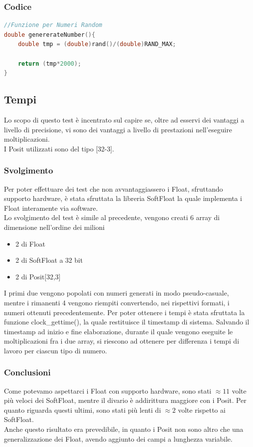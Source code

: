 \documentclass[a4paper,11pt]{article}
\begin{document}
\subsubsection{Codice}
\begin{lstlisting}[language=C++]
//Funzione per Numeri Random
double genererateNumber(){
	double tmp = (double)rand()/(double)RAND_MAX;
	
	return (tmp*2000);
}

\end{lstlisting}
\newpage
\subsection{Tempi}
Lo scopo di questo test è incentrato sul capire se, oltre ad esservi dei vantaggi a livello di precisione, vi sono dei vantaggi a livello di prestazioni nell'eseguire moltiplicazioni.\\
I Posit utilizzati sono del tipo [32-3]. 


\subsubsection{Svolgimento}
Per poter effettuare dei test che non avvantaggiassero i Float, sfruttando supporto hardware, è stata sfruttata la libreria SoftFloat\cite{softfloat} la quale implementa i Float interamente via software.\\
Lo svolgimento del test è simile al precedente, vengono creati 6 array di dimensione nell'ordine dei milioni \begin{itemize}
	\item 2 di Float
	\item 2 di SoftFloat a 32 bit
	\item 2 di Posit[32,3]
\end{itemize}
I primi due vengono popolati con numeri generati in modo pseudo-casuale, mentre i rimanenti 4 vengono riempiti convertendo, nei rispettivi formati, i numeri ottenuti precedentemente. Per poter ottenere i tempi è stata sfruttata la funzione clock\_gettime(), la quale restituisce il timestamp di sistema. Salvando il timestamp ad inizio e fine elaborazione, durante il quale vengono eseguite le moltiplicazioni fra i due array, si riescono ad ottenere per differenza i tempi di lavoro per ciascun tipo di numero.

\subsubsection{Conclusioni}
Come potevamo aspettarci i Float con supporto hardware, sono stati $\approx11$ volte più veloci dei SoftFloat, mentre il divario è addirittura maggiore con i Posit. Per quanto riguarda questi ultimi, sono stati più lenti di $\approx2$ volte rispetto ai SoftFloat.\\ Anche questo risultato era prevedibile, in quanto i Posit non sono altro che una generalizzazione dei Float, avendo aggiunto dei campi a lunghezza variabile.
\end{document}
